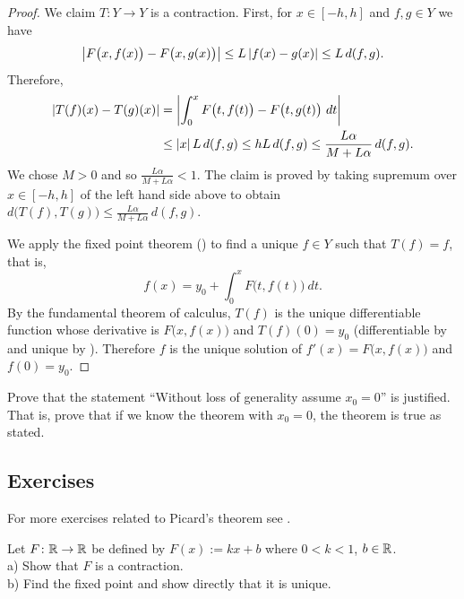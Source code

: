 \begin{proof}
We claim $T \colon Y \to Y$ is a contraction.  First, for $x \in [-h,h]$
and $f,g \in Y$ we have
\begin{equation*}
\left\lvert {F\bigl(x,f(x)\bigr) - F\bigl(x,g(x)\bigr)} \right\rvert \leq
L\left\lvert {f(x)- g(x)} \right\rvert \leq L \, d(f,g) .
\end{equation*}
Therefore,
\begin{equation*}
\begin{split}
\left\lvert {T(f)(x) - T(g)(x)} \right\rvert
&= \left\lvert {\int_0^x F\bigl(t,f(t)\bigr) - F\bigl(t,g(t)\bigr)~dt} \right\rvert \\
& \leq \left\lvert {x} \right\rvert L \, d(f,g)
 \leq h L\, d(f,g)
 \leq \frac{L\alpha}{M+L\alpha} \, d(f,g) .
\end{split}
\end{equation*}
We chose $M > 0$ and so
$\frac{L\alpha}{M+L\alpha} < 1$.  The claim is proved by
taking supremum over $x \in [-h,h]$ of the left hand side above to obtain
$d\bigl(T(f),T(g)\bigr) \leq \frac{L\alpha}{M+L\alpha} \, d(f,g)$.

We apply the fixed point theorem ()
to find a unique $f \in Y$ such that $T(f) = f$, that is,
\begin{equation*} %
f(x) = y_0 + \int_0^x F\bigl(t,f(t)\bigr)~dt .
\end{equation*}
By the fundamental theorem of calculus,
$T(f)$ is the unique differentiable 
function whose derivative is
$F\bigl(x,f(x)\bigr)$ and $T(f)(0) = y_0$
(differentiable by  and
unique by ).  Therefore $f$ is the unique
solution of $f'(x) = F\bigl(x,f(x)\bigr)$ and $f(0) = y_0$.
\end{proof}

\begin{exercise}
Prove that the statement ``Without loss of generality assume $x_0 = 0$'' is
justified.  That is, prove that if we know the theorem with $x_0 = 0$, the
theorem is true as stated.
\end{exercise}

\subsection{Exercises}

\begin{exnote}
For more exercises related to Picard's theorem see .
\end{exnote}

\begin{exercise}
Let $F \colon {\mathbb{R}} \to {\mathbb{R}}$ be defined by
$F(x) := kx + b$ where $0 < k < 1$, $b \in {\mathbb{R}}$.\\
a) Show that $F$ is a contraction.\\
b) Find the fixed
point and show directly that it is unique.
\end{exercise}

